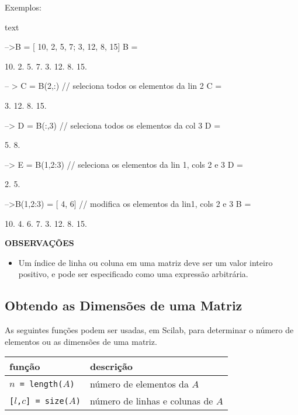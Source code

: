 \documentclass[11pt,fleqn]{practice}
\begin{document}
Exemplos: 


\begin{lst}{text}

-->B = [ 10, 2, 5, 7; 3,  12,  8, 15]    
 B  =
 
     10.    2.      5.    7.
     3.     12.     8.    15.
     
-- > C = B(2,:)         // seleciona todos os elementos da lin 2
 C  =
 
     3.     12.     8.    15.

--> D = B(:,3)          // seleciona todos os elementos da col 3
D  =
 
     5.
     8.

--> E = B(1,2:3)       // seleciona os elementos da lin 1, cols 2 e 3 
D  =
 
     2.     5. 

-->B(1,2:3) = [ 4, 6]  // modifica os elementos da lin1, cols 2 e 3
 B  =
 
     10.    4.      6.    7.
     3.     12.     8.    15.

\end{lst}

\textbf{OBSERVAÇÕES}
\begin{itemize}
\item Um índice de linha ou coluna em uma matriz deve ser um valor inteiro positivo, 
e pode ser especificado como uma expressão arbitrária.
\end{itemize}  

\subsection{Obtendo as Dimensões de uma Matriz}

As seguintes funções podem ser usadas, em Scilab, para determinar o número de elementos ou as dimensões de uma matriz. 

\begin{center}
  \begin{tabular}{lp{8cm}} \hline
    \textbf{função} & \textbf{descrição} \\\hline
    \texttt{$n$ = length($A$)} & número de elementos da $A$ \\\hline
    \texttt{[$l$,$c$] = size($A$)} & número de linhas e colunas de $A$ \\\hline
  \end{tabular}
\end{center}
\end{document}
